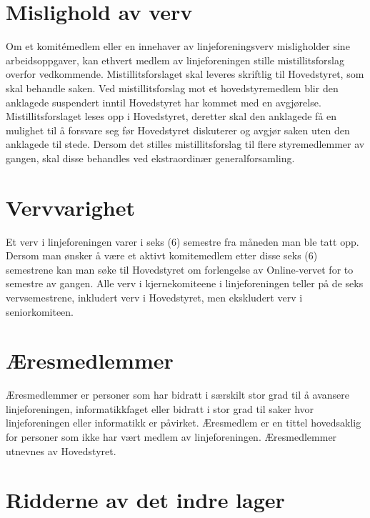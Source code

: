 \section{Mislighold av verv}
\vspace{23pt}

Om et komitémedlem eller en innehaver av linjeforeningsverv misligholder sine arbeidsoppgaver, kan ethvert medlem av linjeforeningen stille mistillitsforslag overfor vedkommende. Mistillitsforslaget skal leveres skriftlig til Hovedstyret, som skal behandle saken. Ved mistillitsforslag mot et hovedstyremedlem blir den anklagede suspendert inntil Hovedstyret har kommet med en avgjørelse. Mistillitsforslaget leses opp i Hovedstyret, deretter skal den anklagede få en mulighet til å forsvare seg før Hovedstyret diskuterer og avgjør saken uten den anklagede til stede. Dersom det stilles mistillitsforslag til flere styremedlemmer av gangen, skal disse behandles ved ekstraordinær generalforsamling. 


\section{Vervvarighet}
\vspace{23pt}

Et verv i linjeforeningen varer i seks (6) semestre fra måneden man ble tatt opp. Dersom man ønsker å være et aktivt komitemedlem etter disse seks (6) semestrene kan man søke til Hovedstyret om forlengelse av Online-vervet for to semestre av gangen. Alle verv i kjernekomiteene i linjeforeningen teller på de seks vervsemestrene, inkludert verv i Hovedstyret, men ekskludert verv i seniorkomiteen. 


\section{Æresmedlemmer}
\vspace{23pt}

Æresmedlemmer er personer som har bidratt i særskilt stor grad til å avansere linjeforeningen, informatikkfaget eller bidratt i stor grad til saker hvor linjeforeningen eller informatikk er påvirket.
Æresmedlem er en tittel hovedsaklig for personer som ikke har vært medlem av linjeforeningen.
Æresmedlemmer utnevnes av Hovedstyret.

\section{Ridderne av det indre lager}
\vspace{23pt}

